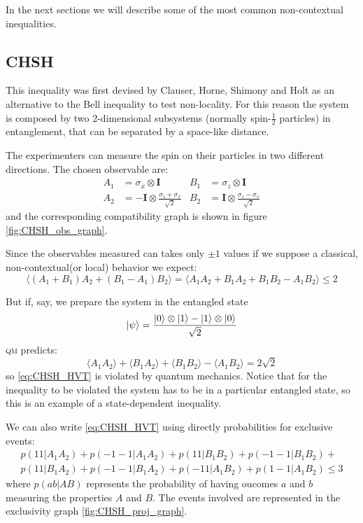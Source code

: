 \documentclass[a4paper]{article}
\newcommand{\acron}[1]{\textsc{#1}}
\newcommand{\QM}{\acron{qm}}
\newcommand{\I}{\mathbf{I}}
\theoremstyle{definition}
\begin{document}
In the next sections we will describe some of the most common non-contextual
inequalities.

\subsection{CHSH}
\label{sec:CHSH}
This inequality was first devised by Clauser, Horne, Shimony and Holt as an
alternative to the Bell inequality to test non-locality.
For this reason the system is composed by two 2-dimensional subsystems
(normally spin-$\frac{1}{2}$ particles) in
entanglement, that can be separated by a space-like distance.

The experimenters can measure the spin on their particles in two different directions.
The chosen observable are:
\begin{align}
    A_1 &= \sigma_x \otimes \I &
        B_1 &= \sigma_z \otimes \I \\
    A_2 &=  - \I \otimes \frac{\sigma_z + \sigma_x}{\sqrt{2}} 
        & B_2 &=  \I \otimes \frac{\sigma_z - \sigma_x}{\sqrt{2}} 
    \label{eq:CHSH_obs}
\end{align}
and the corresponding compatibility graph is shown in figure
\ref{fig:CHSH_obs_graph}.

Since the observables measured can takes only $\pm 1$ values if we suppose a classical,
non-contextual(or local) behavior we expect:
\begin{equation}
    \langle{(A_1 + B_1) A_2 + (B_1 - A_1) B_2}\rangle = 
    \langle{A_1A_2 + B_1A_2 + B_1B_2 - A_1B_2}\rangle \le 2
    \label{eq:CHSH_HVT}
\end{equation}

But if, say, we prepare the system in the entangled state
\begin{equation}
    \Ket{\psi} = \frac{\Ket{0}\otimes\Ket{1} -
    \Ket{1}\otimes\Ket{0}}{\sqrt{2}} 
    \label{eq:bell_state_psim}
\end{equation}
\QM{} predicts:
\begin{equation}
    \langle{A_1A_2}\rangle + \langle{B_1A_2}\rangle + \langle{B_1B_2}\rangle
    - \langle{A_1B_2}\rangle = 2\sqrt{2}
    \label{eq:CHSH_QM}
\end{equation}
so \eqref{eq:CHSH_HVT} is violated by quantum mechanics.
Notice that for the inequality to be violated the system has to be in a particular entangled
state, so this is an example of a state-dependent inequality.

We can also write \eqref{eq:CHSH_HVT} using directly probabilities for exclusive events:
\begin{multline}
    p(11| A_1 A_2) + p(-1-1| A_1 A_2) +
    p(11| B_1 B_2) + p(-1-1| B_1 B_2) +\\
    p(11| B_1 A_2) + p(-1-1| B_1 A_2) +
    p(-11| A_1 B_2) + p(1-1| A_1 B_2) \le 3
\end{multline}
where $p(ab|AB)$ represents the probability of having oucomes $a$ and $b$
measuring the properties $A$ and $B$.
The events involved are represented in the exclusivity graph \ref{fig:CHSH_proj_graph}.
\end{document}
